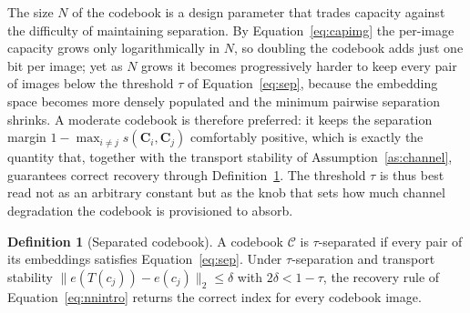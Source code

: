 \documentclass[11pt]{article}
\theoremstyle{definition}
\newtheorem{definition}{Definition}[section]
\newcommand{\Eqn}[1]{Equation~\eqref{#1}}
\begin{document}
The size $N$ of the codebook is a design parameter that trades capacity against the
difficulty of maintaining separation. By \Eqn{eq:capimg} the per-image capacity
grows only logarithmically in $N$, so doubling the codebook adds just one bit per
image; yet as $N$ grows it becomes progressively harder to keep every pair of images
below the threshold $\tau$ of \Eqn{eq:sep}, because the embedding space becomes more
densely populated and the minimum pairwise separation shrinks. A moderate codebook
is therefore preferred: it keeps the separation margin $1-\max_{i\neq j}s(\mathbf{C}
_i,\mathbf{C}_j)$ comfortably positive, which is exactly the quantity that, together
with the transport stability of Assumption~\ref{as:channel}, guarantees correct
recovery through Definition~\ref{def:sep}. The threshold $\tau$ is thus best read
not as an arbitrary constant but as the knob that sets how much channel degradation
the codebook is provisioned to absorb.

\begin{definition}[Separated codebook]\label{def:sep}
A codebook $\mathcal{C}$ is $\tau$-separated if every pair of its embeddings
satisfies \Eqn{eq:sep}. Under $\tau$-separation and transport stability
$\lVert e(T(c_j))-e(c_j)\rVert_2\le\delta$ with $2\delta<1-\tau$, the recovery rule
of \Eqn{eq:nnintro} returns the correct index for every codebook image.
\end{definition}

\end{document}
